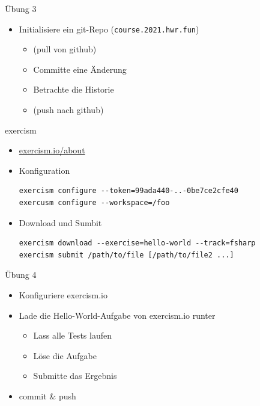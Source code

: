 \documentclass[t]{beamer}
\begin{document}
\begin{frame}[label={sec:org1792432},fragile]{Übung 3}
 \begin{itemize}
\item Initialisiere ein git-Repo (\texttt{course.2021.hwr.fun})
\begin{itemize}
\item (pull von github)
\item Committe eine Änderung
\item Betrachte die Historie
\item (push nach github)
\end{itemize}
\end{itemize}
\end{frame}

\begin{frame}[label={sec:org7b14add},fragile]{exercism}
 \begin{itemize}
\item \href{https://exercism.io/about}{exercism.io/about}
\item Konfiguration
\begin{verbatim}
exercism configure --token=99ada440-..-0be7ce2cfe40
exercusm configure --workspace=/foo
\end{verbatim}
\item Download und Sumbit
\begin{verbatim}
exercism download --exercise=hello-world --track=fsharp
exercism submit /path/to/file [/path/to/file2 ...]
\end{verbatim}
\end{itemize}
\end{frame}

\begin{frame}[label={sec:orga970952}]{Übung 4}
\begin{itemize}
\item Konfiguriere exercism.io
\item Lade die Hello-World-Aufgabe von exercism.io runter
\begin{itemize}
\item Lass alle Tests laufen
\item Löse die Aufgabe
\item Submitte das Ergebnis
\end{itemize}
\item commit \& push
\end{itemize}
\end{frame}
\end{document}
